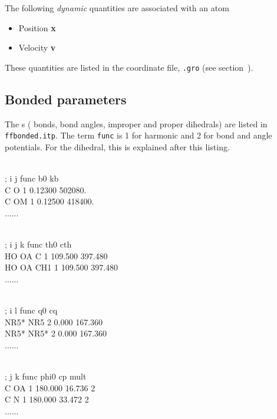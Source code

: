 The following {\em dynamic} quantities are associated with an atom
\begin{itemize}
\item   Position {\bf x}
\item   Velocity {\bf v}
\end{itemize}
These quantities are listed in the coordinate file, {\tt *.gro}
(see section~).

\subsection{Bonded parameters}
\label{subsec:bondparam}
The s ({\ie} bonds, bond angles, improper and proper
dihedrals) are listed in {\tt ffbonded.itp}. The term {\tt func} is 1 for
harmonic and 2 for  bond and angle potentials.
For the dihedral, this is explained after this listing.

\begin{tt}
[ bondtypes ]\\
  ; i    j func        b0          kb\\
    C    O    1   0.12300     502080.\\
    C   OM    1   0.12500     418400.\\
    ......\\
\end{tt}

\begin{tt}
[ angletypes ] \\
  ; i    j    k func       th0         cth\\
   HO   OA    C    1   109.500     397.480\\
   HO   OA  CH1    1   109.500     397.480\\
   ......\\
\end{tt}

\begin{tt}
[ dihedraltypes ] \\
  ; i    l func        q0          cq\\
 NR5*  NR5    2     0.000     167.360\\
 NR5* NR5*    2     0.000     167.360\\
 ......\\
\end{tt}

\begin{tt}
[ dihedraltypes ] \\
  ; j    k func      phi0          cp   mult\\
    C   OA    1   180.000      16.736      2\\
    C    N    1   180.000      33.472      2\\
    ......\\
\end{tt}

